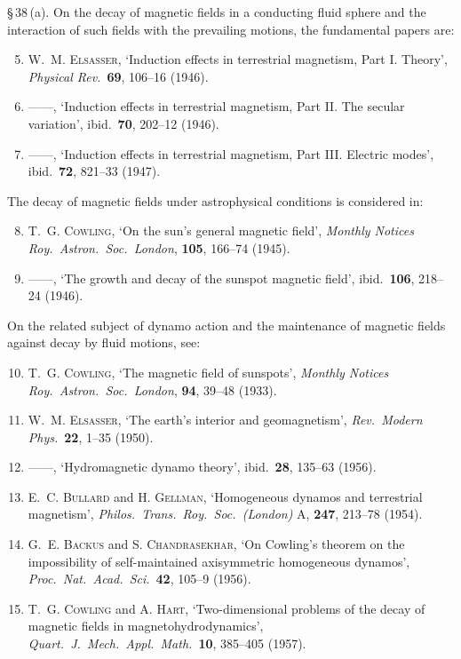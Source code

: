 \S\,38\,(a). On the decay of magnetic fields in a conducting fluid sphere and the interaction of such fields with the prevailing motions, the fundamental papers are:
\begin{enumerate}
\setcounter{enumi}{4}
\item W.~M. \textsc{Elsasser}, `Induction effects in terrestrial magnetism, Part I. Theory', \emph{Physical Rev.}\ \textbf{69}, 106--16 (1946).
\item ------, `Induction effects in terrestrial magnetism, Part II. The secular variation', ibid.\ \textbf{70}, 202--12 (1946).
\item ------, `Induction effects in terrestrial magnetism, Part III. Electric modes', ibid.\ \textbf{72}, 821--33 (1947).
\end{enumerate}

The decay of magnetic fields under astrophysical conditions is considered in:
\begin{enumerate}
\setcounter{enumi}{7}
\item T.~G. \textsc{Cowling}, `On the sun's general magnetic field', \emph{Monthly Notices Roy.\ Astron.\ Soc.\ London}, \textbf{105}, 166--74 (1945).
\item ------, `The growth and decay of the sunspot magnetic field', ibid.\ \textbf{106}, 218--24 (1946).
\end{enumerate}

On the related subject of dynamo action and the maintenance of magnetic fields against decay by fluid motions, see:
\begin{enumerate}
\setcounter{enumi}{9}
\item T.~G. \textsc{Cowling}, `The magnetic field of sunspots', \emph{Monthly Notices Roy.\ Astron.\ Soc.\ London}, \textbf{94}, 39--48 (1933).
\item W.~M. \textsc{Elsasser}, `The earth's interior and geomagnetism', \emph{Rev.\ Modern Phys.}\ \textbf{22}, 1--35 (1950).
\item ------, `Hydromagnetic dynamo theory', ibid.\ \textbf{28}, 135--63 (1956).
\item E.~C. \textsc{Bullard} and H. \textsc{Gellman}, `Homogeneous dynamos and terrestrial magnetism', \emph{Philos.\ Trans.\ Roy.\ Soc.\ (London)} A, \textbf{247}, 213--78 (1954).
\item G.~E. \textsc{Backus} and S. \textsc{Chandrasekhar}, `On Cowling's theorem on the impossibility of self-maintained axisymmetric homogeneous dynamos', \emph{Proc.\ Nat.\ Acad.\ Sci.}\ \textbf{42}, 105--9 (1956).
\item T.~G. \textsc{Cowling} and A. \textsc{Hart}, `Two-dimensional problems of the decay of magnetic fields in magnetohydrodynamics', \emph{Quart.\ J.\ Mech.\ Appl.\ Math.}\ \textbf{10}, 385--405 (1957).
\end{enumerate}

